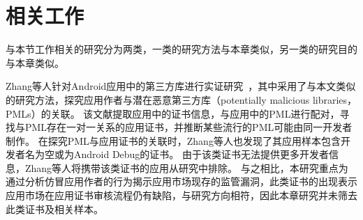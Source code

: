 

\section{相关工作}

与本节工作相关的研究分为两类，一类的研究方法与本章类似，另一类的研究目的与本章类似。

Zhang等人针对Android应用中的第三方库进行实证研究~\cite{zhang2020empirical}，其中采用了与本文类似的研究方法，探究应用作者与潜在恶意第三方库（potentially malicious libraries，PMLs）的关联。
该文献提取应用中的证书信息，与应用中的PML进行配对，寻找与PML存在一对一关系的应用证书，并推断某些流行的PML可能由同一开发者制作。
在探究PML与应用证书的关联时，Zhang等人也发现了其应用样本包含开发者名为空或为Android Debug的证书。
由于该类证书无法提供更多开发者信息，Zhang等人将携带该类证书的应用从研究中排除。
与之相比，本研究重点为通过分析仿冒应用作者的行为揭示应用市场现存的监管漏洞，此类证书的出现表示应用市场在应用证书审核流程仍有缺陷，与研究方向相符，因此本章研究并未筛去此类证书及相关样本。

